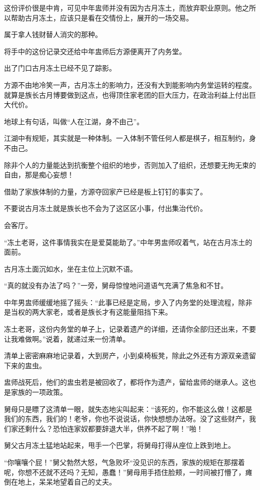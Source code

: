 \begin{this_body}
这份评价很是中肯，可见中年盅师并没有因为古月冻土，而放弃职业原则。他之所以帮助古月冻土，应该只是看在交情份上，展开的一场交易。

属于拿人钱财替人消灾的那种。

将手中的这份记录交还给中年盅师后方源便离开了内务堂。

出了门口古月冻土已经不见了踪影。

方源不由地冷笑一声，古月冻土的影响力，还没有大到能影响内务堂运转的程度。就算是族长古月博要做到这点，也得顶住家老团的巨大压力，在政治利益上付出巨大代价。

地球上有句话，叫做“人在江湖，身不由己”。

江湖中有规矩，其实就是一种体制。一入体制不管任何人都是棋子，相互制约，身不由己。

除非个人的力量能达到抗衡整个组织的地步，否则加入了组织，还想要无拘无束的自由，那是痴心妄想！

借助了家族体制的力量，方源夺回家产已经是板上钉钉的事实了。

不要说古月冻土就是族长也不会为了这区区小事，付出集治代价。

会客厅。

“冻土老哥，这件事情我实在是爱莫能助了。”中年男盅师叹着气，站在古月冻土的面前。

古月冻土面沉如水，坐在主位上沉默不语。

“真的就没有办法了吗？”一旁，舅母惊惶地问道语气充满了焦急和不甘。

中年男盅师缓缓地摇了摇头：“此事已经是定局，步入了内务堂的处理流程，除非是当权的两大家老，或者是族长才有这能量阻挡下来。

冻土老哥，这份内务堂的单子上，记录着遗产的详细，还请你全部归还出来，不要让我难做啊。”说着，就递过来一份清单。

清单上密密麻麻地记录着，大到房产，小到桌椅板凳，除此之外还有方源双亲遗留下来的盅虫。

盅师战死后，他们的盅虫若是被回收了，都将作为遗产，留给盅师的继承人。这也是家族的一项政策。

舅母只是瞟了这清单一眼，就失态地尖叫起来：“该死的，你不能这么做！这都是我们的东西，我们的！老爷，你也不说说话，你快想想办法呀。没了这些财产，我们家还剩什么？恐怕连家奴都要辞退大半，供养不起了啊！”啪！

舅父古月冻土猛地站起来，甩手一个巴掌，将舅母打得从座位上跌到地上。

“你嚷嚷个屁！”舅父勃然大怒，气急败坏“没见识的东西，家族的规矩在那摆着呢，你想不还就不还吗？无知，愚蠢！”舅母用手捂住脸颊，一时间被打懵了，瘫倒在地上，呆呆地望着自己的丈夫。


\end{this_body}
